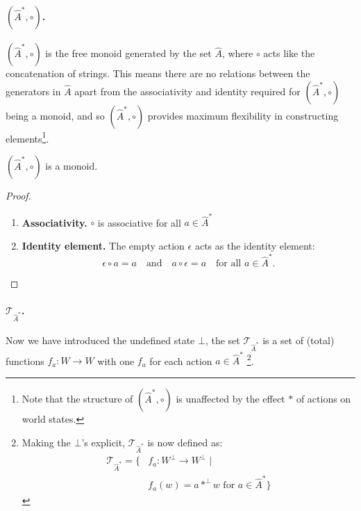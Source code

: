 \paragraph{$(\hat{A}^{\ast}, \circ)$.}
$(\hat{A}^{\ast}, \circ)$ is the free monoid generated by the set $\hat{A}$, where $\circ$ acts like the concatenation of strings.
This means there are no relations between the generators in $\hat{A}$ apart from the associativity and identity required for $(\hat{A}^{\ast}, \circ)$ being a monoid, and so $(\hat{A}^{\ast}, \circ)$ provides maximum flexibility in constructing elements\footnote{Note that the structure of $(\hat{A}^{\ast}, \circ)$ is unaffected by the effect $\ast$ of actions on world states.}.

\begin{proposition}
	$(\hat{A}^{\ast}, \circ)$ is a monoid.
\end{proposition}
\begin{proof}
	\begin{enumerate}[(1)]
		\item \textbf{Associativity.}
		      $\circ$ is associative for all $a \in \hat{A}^{\ast}$
		\item \textbf{Identity element.}
		      The empty action $\epsilon$ acts as the identity element:
		      \begin{equation}
			      \epsilon \circ a = a \quad \text{and} \quad a \circ \epsilon = a \quad \text{for all } a \in \hat{A}^{\ast}.
		      \end{equation}
	\end{enumerate}
\end{proof}

\paragraph{$\mathcal{T}_{\hat{A}^{\ast}}$.}
Now we have introduced the undefined state $\bot$, the set $\mathcal{T}_{\hat{A}^{\ast}}$ is a set of (total) functions $f_{a}: W \to W$ with one $f_{a}$ for each action $a \in \hat{A}^{\ast}$ \footnote{
Making the $\bot$'s explicit, $\mathcal{T}_{\hat{A}^{\ast}}$ is now defined as:
\begin{equation}
	\begin{aligned}
		\mathcal{T}_{\hat{A}^{\ast}} = \{ & f_{a}: W^{\bot} \to W^{\bot} \mid                                \\
		                                  & f_{a}(w) = a \ast^{\bot} w \text{ for $a \in \hat{A}^{\ast}$} \}
	\end{aligned}
\end{equation}
}.

